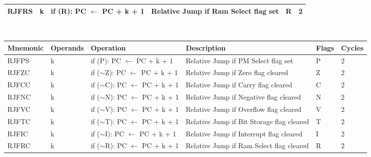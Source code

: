 \begin{footnotesize}
\begin{tabular}{|p{14.5mm}|p{14mm}|p{47mm}|p{46.5mm}|p{14mm}|p{10mm}|}
    RJFRS    & k         & if (R): PC $\leftarrow$ PC + k + 1                                     & Relative Jump \newline if Ram Select flag set      & R              & 2      \\
    \hline
\end{tabular}
\newline\\
\begin{tabular}{|p{14.5mm}|p{14mm}|p{47mm}|p{46.5mm}|p{14mm}|p{10mm}|}
    \rowcolor{gray!50}
    \hline
    Mnemonic & Operands  & Operation                                                              & Description & Flags & Cycles \\ \hline
    RJFPS    & k         & if (P): PC $\leftarrow$ PC + k + 1                                     & Relative Jump \newline if PM Select flag set       & P              & 2      \\
    RJFZC    & k         & if ($\sim$Z): PC $\leftarrow$ PC + k + 1                               & Relative Jump if Zero flag cleared        & Z              & 2      \\
    RJFCC    & k         & if ($\sim$C): PC $\leftarrow$ PC + k + 1                               & Relative Jump \newline if Carry flag cleared       & C              & 2      \\
    RJFNC    & k         & if ($\sim$N): PC $\leftarrow$ PC + k + 1                               & Relative Jump \newline if Negative flag cleared    & N              & 2      \\
    RJFVC    & k         & if ($\sim$V): PC $\leftarrow$ PC + k + 1                               & Relative Jump \newline if Overflow flag cleared    & V              & 2      \\
    RJFTC    & k         & if ($\sim$T): PC $\leftarrow$ PC + k + 1                               & Relative Jump \newline if Bit Storage flag cleared & T              & 2      \\
    RJFIC    & k         & if ($\sim$I): PC $\leftarrow$ PC + k + 1                               & Relative Jump \newline if Interrupt flag cleared   & I              & 2      \\
    RJFRC    & k         & if ($\sim$R): PC $\leftarrow$ PC + k + 1                               & Relative Jump \newline if Ram Select flag cleared  & R              & 2      \\

\end{tabular}
\end{footnotesize}
